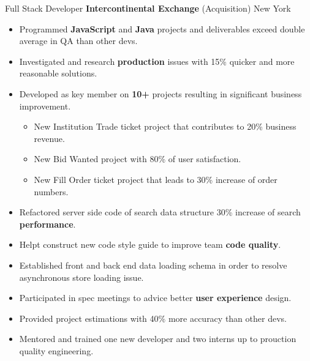 \documentclass[11pt,a4paper,sans]{moderncv}   %
\begin{document}
{Full Stack Developer}
{\textbf{Intercontinental Exchange}}
{(Acquisition)}
{New York}
{
	\begin{itemize}
	  \item{Programmed \textbf{JavaScript} and \textbf{Java} projects and deliverables exceed double average in QA than other devs.}
	  \item{Investigated and research \textbf{production} issues with 15\% quicker and more reasonable solutions.}
    \item{Developed as key member on \textbf{10+} projects resulting in significant business improvement.}
    \begin{itemize}
      \item{New Institution Trade ticket project that contributes to 20\% business revenue.}
      \item{New Bid Wanted project with 80\% of user satisfaction.}
      \item{New Fill Order ticket project that leads to 30\% increase of order numbers.}
    \end{itemize}
    \item{Refactored server side code of search data structure 30\% increase of search \textbf{performance}.}
    \item{Helpt construct new code style guide to improve team \textbf{code quality}.}
    \item{Established front and back end data loading schema in order to resolve asynchronous store loading issue.}
    \item{Participated in spec meetings to advice better \textbf{user experience} design.}
    \item{Provided project estimations with 40\% more accuracy than other devs.}
    \item{Mentored and trained one new developer and two interns up to prouction quality engineering.}
	\end{itemize}
}
\end{document}
